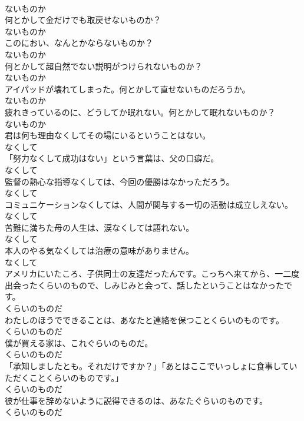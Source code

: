 \documentclass[8pt]{extreport}
\begin{document}
\begin{CJK}{UTF8}{min}
\\	ないものか
\\	何とかして金だけでも取戻せないものか？	
\\	ないものか
\\	このにおい、なんとかならないものか？	
\\	ないものか
\\	何とかして超自然でない説明がつけられないものか？	
\\	ないものか
\\	アイパッドが壊れてしまった。何とかして直せないものだろうか。	
\\	ないものか
\\	疲れきっているのに、どうしてか眠れない。何とかして眠れないものか？	
\\	ないものか
\\	君は何も理由なくしてその場にいるということはない。	
\\	なくして
\\	「努力なくして成功はない」という言葉は、父の口癖だ。	
\\	なくして
\\	監督の熱心な指導なくしては、今回の優勝はなかっただろう。	
\\	なくして
\\	コミュニケーションなくしては、人間が関与する一切の活動は成立しえない。	
\\	なくして
\\	苦難に満ちた母の人生は、涙なくしては語れない。	
\\	なくして
\\	本人のやる気なくしては治療の意味がありません。	
\\	なくして
\\	アメリカにいたころ、子供同士の友達だったんです。こっちへ来てから、一二度出会ったくらいのもので、しみじみと会って、話したということはなかったです。	
\\	くらいのものだ
\\	わたしのほうでできることは、あなたと連絡を保つことくらいのものです。	
\\	くらいのものだ
\\	僕が買える家は、これぐらいのものだ。	
\\	くらいのものだ
\\	「承知しましたとも。それだけですか？」「あとはここでいっしょに食事していただくことくらいのものです。」	
\\	くらいのものだ
\\	彼が仕事を辞めないように説得できるのは、あなたぐらいのものです。	
\\	くらいのものだ

\end{CJK}
\end{document}
